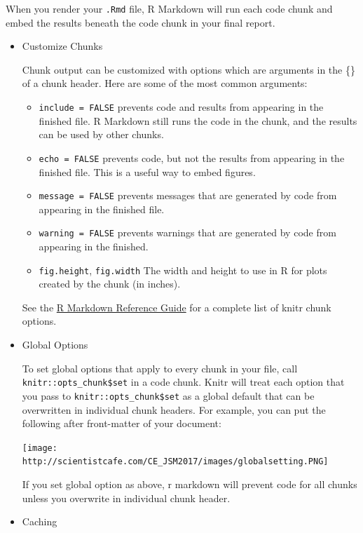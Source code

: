 \documentclass[]{book}
\providecommand{\tightlist}{%
  \setlength{\itemsep}{0pt}\setlength{\parskip}{0pt}}
\theoremstyle{definition}
\theoremstyle{definition}
\theoremstyle{remark}
\begin{document}
When you render your \texttt{.Rmd} file, R Markdown will run each code
chunk and embed the results beneath the code chunk in your final report.

\begin{itemize}
\item
  Customize Chunks

  Chunk output can be customized with options which are arguments in the
  \{\} of a chunk header. Here are some of the most common arguments:

  \begin{itemize}
  \tightlist
  \item
    \texttt{include\ =\ FALSE} prevents code and results from appearing
    in the finished file. R Markdown still runs the code in the chunk,
    and the results can be used by other chunks.
  \item
    \texttt{echo\ =\ FALSE} prevents code, but not the results from
    appearing in the finished file. This is a useful way to embed
    figures.
  \item
    \texttt{message\ =\ FALSE} prevents messages that are generated by
    code from appearing in the finished file.
  \item
    \texttt{warning\ =\ FALSE} prevents warnings that are generated by
    code from appearing in the finished.
  \item
    \texttt{fig.height}, \texttt{fig.width} The width and height to use
    in R for plots created by the chunk (in inches).
  \end{itemize}

  See the
  \href{https://www.rstudio.com/wp-content/uploads/2015/03/rmarkdown-reference.pdf}{R
  Markdown Reference Guide} for a complete list of knitr chunk options.
\item
  Global Options

  To set global options that apply to every chunk in your file, call
  \texttt{knitr::opts\_chunk\$set} in a code chunk. Knitr will treat
  each option that you pass to \texttt{knitr::opts\_chunk\$set} as a
  global default that can be overwritten in individual chunk headers.
  For example, you can put the following after front-matter of your
  document:

  \texttt{[image: http://scientistcafe.com/CE\_JSM2017/images/globalsetting.PNG]}

  If you set global option as above, r markdown will prevent code for
  all chunks unless you overwrite in individual chunk header.
\item
  Caching


\end{itemize}
\end{document}
